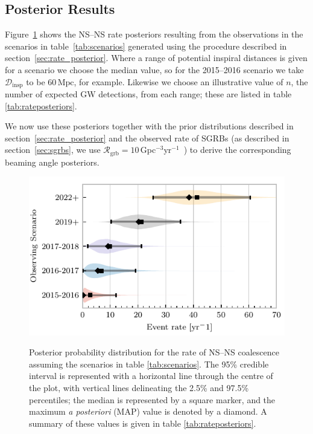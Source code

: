 \documentclass[twocolumn,nofootinbib]{revtex4-1}
\newcommand{\grbrate}{{{\mathcal R}_{\mathrm{grb}}}}
\newcommand{\dinsp}{\ensuremath{{\mathcal D}_{\mathrm{insp}}}}
\newcommand{\latin}[1]{\textit{#1}}
\newcommand{\mpc}{\mathrm{Mpc}}
\newcommand{\BNS}{\ac{NS}--\ac{NS}\xspace}
\begin{document}
\subsection{Posterior Results}
Figure~\ref{fig:aligorate} shows the \BNS rate posteriors resulting
from the observations in the scenarios in table~\ref{tab:scenarios}
generated using the procedure described in
section~\ref{sec:rate_posterior}. Where a range of potential inspiral
distances is given for a scenario we choose the median value, so for
the 2015--2016 scenario we take \dinsp{} to be $60\,\mpc$, for
example. Likewise we choose an illustrative value of $n$, the number
of expected \ac{GW} detections, from each range; these are listed in
table \ref{tab:rateposteriors}.

We now use these posteriors together with the prior distributions
described in section~\ref{sec:rate_posterior} and the observed rate of
\acp{SGRB} (as described in section~\ref{sec:sgrbs}, we use
$\grbrate=10$\,Gpc$^{-3}$yr$^{-1}$~\cite{Nakar:2007yr,Dietz:2010eh})
to derive the corresponding beaming angle posteriors.

\begin{figure}
\centering
{\includegraphics[width=\linewidth]{rate_posteriors_violin.pdf}}
\caption{Posterior probability distribution for the rate of \BNS
    coalescence assuming the scenarios in table \ref{tab:scenarios}.
    The 95\% credible interval is represented with a horizontal line through
    the centre of the plot, with vertical lines delineating the 2.5\% and
    97.5\% percentiles; the median is represented by a square marker, and the
    maximum \latin{a posteriori} (\ac{MAP}) value is denoted by a diamond. A
    summary of these values is given in table \ref{tab:rateposteriors}.
    \label{fig:aligorate} }
\end{figure}
\end{document}
